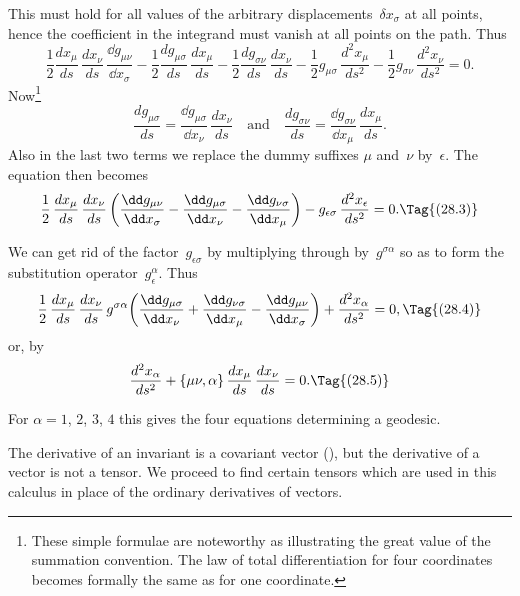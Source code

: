 \documentclass[12pt]{book}
\begin{document}
This must hold for all values of the arbitrary displacements~$\delta x_{\sigma}$ at all
%
points, hence the coefficient in the integrand must vanish at all points on the
path. Thus
\[
\frac{1}{2} \frac{dx_{\mu}}{ds}\, \frac{dx_{\nu}}{ds}\, \frac{\dd g_{\mu\nu}}{\dd x_{\sigma}}
  - \frac{1}{2} \frac{dg_{\mu\sigma}}{ds}\, \frac{dx_{\mu}}{ds}
  - \frac{1}{2} \frac{dg_{\sigma\nu}}{ds}\, \frac{dx_{\nu}}{ds}
  - \frac{1}{2} g_{\mu\sigma}\, \frac{d^{2}x_{\mu}}{ds^{2}}
  - \frac{1}{2} g_{\sigma\nu}\, \frac{d^{2}x_{\nu}}{ds^{2}} = 0.
\]
Now\footnote
  {These simple formulae are noteworthy as illustrating the great value of the summation
  convention. The law of total differentiation for four coordinates becomes formally the same as for
  one coordinate.}
\[
\frac{dg_{\mu\sigma}}{ds} = \frac{\dd g_{\mu\sigma}}{\dd x_{\nu}}\, \frac{dx_{\nu}}{ds}
\quad\text{and}\quad
\frac{dg_{\sigma\nu}}{ds} = \frac{\dd g_{\sigma\nu}}{\dd x_{\mu}}\, \frac{dx_{\mu}}{ds}.
\]
Also in the last two terms we replace the dummy suffixes $\mu$ and~$\nu$ by~$\epsilon$. The
equation then becomes
\[
\frac{1}{2}\, \frac{dx_{\mu}}{ds}\, \frac{dx_{\nu}}{ds}\,
\biggl(\frac{\dd g_{\mu\nu}}{\dd x_{\sigma}} - \frac{\dd g_{\mu\sigma}}{\dd x_{\nu}} - \frac{\dd g_{\nu\sigma}}{\dd x_{\mu}}\biggr)
- g_{\epsilon\sigma}\, \frac{d^{2} x_{\epsilon}}{ds^{2}} = 0.
\Tag{(28.3)}
\]

We can get rid of the factor~$g_{\epsilon\sigma}$ by multiplying through by~$g^{\sigma\alpha}$ so as to
form the substitution operator~$g_{\epsilon}^{\alpha}$. Thus
\[
\frac{1}{2}\, \frac{dx_{\mu}}{ds}\, \frac{dx_{\nu}}{ds}\,
g^{\sigma\alpha} \biggl(\frac{\dd g_{\mu\sigma}}{\dd x_{\nu}} + \frac{\dd g_{\nu\sigma}}{\dd x_{\mu}} - \frac{\dd g_{\mu\nu}}{\dd x_{\sigma}}\biggr)
+ \frac{d^{2} x_{\alpha}}{ds^{2}} = 0,
\Tag{(28.4)}
\]
or, by~
\[
\frac{d^{2} x_{\alpha}}{ds^{2}} + \{\mu\nu, \alpha\}\, \frac{dx_{\mu}}{ds}\, \frac{dx_{\nu}}{ds} = 0.
\Tag{(28.5)}
\]

For $\alpha = 1$, $2$, $3$, $4$ this gives the four equations determining a geodesic.

%
%

The derivative of an invariant is a covariant vector (), but the
derivative of a vector is not a tensor. We proceed to find certain tensors
which are used in this calculus in place of the ordinary derivatives of vectors.
\end{document}
